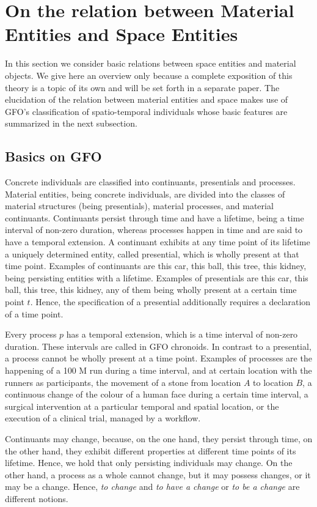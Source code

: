 \documentclass{ao2e}
\begin{document}
{\section{On the relation between Material Entities and Space Entities}
In this section we consider basic relations between space entities and material objects. We give here
an overview only because a complete exposition of this theory is a topic of its own and will be set forth in a separate paper. 
The elucidation of the relation between material entities and space makes use of GFO's classification of spatio-temporal individuals whose basic features are summarized in the next subsection.

\subsection{Basics on GFO}

Concrete individuals are classified into continuants, presentials and processes. 
Material entities, being concrete individuals,  are divided into the classes of
material structures (being presentials), material processes, and material continuants.
 Continuants persist through time and have a lifetime, being a time interval of non-zero duration, whereas processes happen in time and are said to have a temporal extension. A continuant exhibits at any time point of its lifetime a uniquely determined entity, called presential, which is wholly present at that time point. Examples of continuants are this car, this ball, this tree, this kidney, being persisting entities with a lifetime. Examples of presentials are this car, this ball, this tree, this kidney, any of them being wholly present at a certain time point $t$. Hence, the specification of a presential additionally requires a declaration of a time point.

 Every process $p$ has a temporal extension, which is a time interval of non-zero duration. These intervals are called in GFO chronoids.  In contrast to a presential, a process cannot be wholly present at a time point. Examples of processes are the happening of a 100 M run during a time interval, and at certain location with the runners as participants, the movement of a stone from location $A$ to location $B$, a continuous change of the colour of a human face during a certain time interval, a surgical intervention at a particular temporal and spatial location, or the execution of a clinical trial, managed by a workflow.

Continuants may change, because, on the one hand, they persist through time, on the other hand, they exhibit different properties at different time points of its lifetime. Hence, we hold that only persisting individuals may change. On the other hand, a process as a whole cannot change, but it may possess changes, or it may be a change. Hence, {\it to change} and {\it to have a change} or {\it to be a change} are different notions.

}
\end{document}
